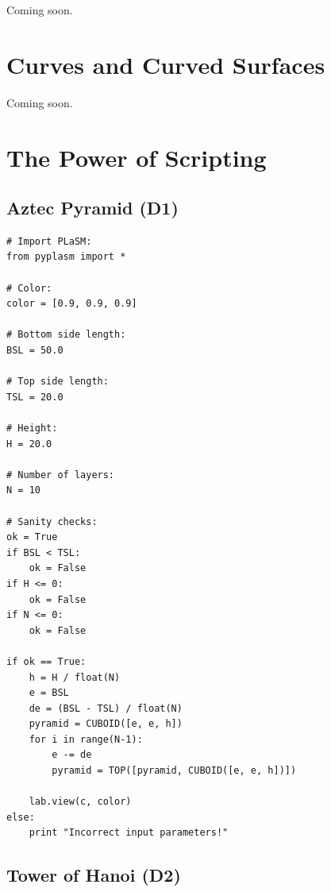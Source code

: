 \documentclass[article,A4,12pt]{llncs}
\begin{document}
Coming soon.


\section{Curves and Curved Surfaces}

Coming soon.



\section{The Power of Scripting}

\subsection{Aztec Pyramid (D1)}

\begin{verbatim}
# Import PLaSM:
from pyplasm import *

# Color:
color = [0.9, 0.9, 0.9]

# Bottom side length:
BSL = 50.0

# Top side length:
TSL = 20.0

# Height:
H = 20.0

# Number of layers:
N = 10

# Sanity checks:
ok = True
if BSL < TSL: 
    ok = False
if H <= 0:
    ok = False
if N <= 0:
    ok = False

if ok == True:
    h = H / float(N)
    e = BSL
    de = (BSL - TSL) / float(N)
    pyramid = CUBOID([e, e, h])
    for i in range(N-1):
        e -= de
        pyramid = TOP([pyramid, CUBOID([e, e, h])])
    
    lab.view(c, color)
else:
    print "Incorrect input parameters!"
\end{verbatim}

\subsection{Tower of Hanoi (D2)}
\end{document}
